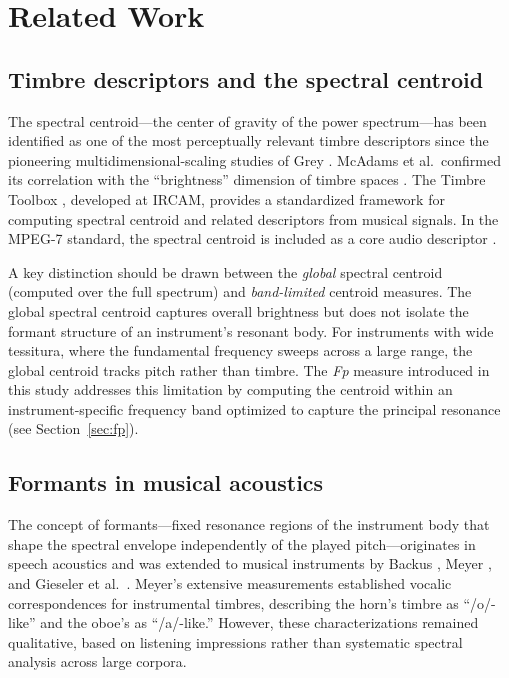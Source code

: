 \documentclass[12pt,a4paper]{article}
\begin{document}
\section{Related Work}

\subsection{Timbre descriptors and the spectral centroid}

The spectral centroid---the center of gravity of the power spectrum---has been
identified as one of the most perceptually relevant timbre descriptors since the
pioneering multidimensional-scaling studies of Grey \citep{Grey1977}. McAdams
et al.\ confirmed its correlation with the ``brightness'' dimension of timbre
spaces \citep{McAdams1995}. The Timbre Toolbox \citep{Peeters2011}, developed
at IRCAM, provides a standardized framework for computing spectral centroid and
related descriptors from musical signals. In the MPEG-7 standard, the spectral
centroid is included as a core audio descriptor \citep{MPEG7}.

A key distinction should be drawn between the \emph{global} spectral centroid
(computed over the full spectrum) and \emph{band-limited} centroid measures. The
global spectral centroid captures overall brightness but does not isolate the
formant structure of an instrument's resonant body. For instruments with wide
tessitura, where the fundamental frequency sweeps across a large range, the
global centroid tracks pitch rather than timbre. The \textit{Fp} measure
introduced in this study addresses this limitation by computing the centroid
within an instrument-specific frequency band optimized to capture the principal
resonance (see Section~\ref{sec:fp}).

\subsection{Formants in musical acoustics}

The concept of formants---fixed resonance regions of the instrument body that
shape the spectral envelope independently of the played pitch---originates in
speech acoustics \citep{Fant1960} and was extended to musical instruments by
Backus \citep{Backus1969}, Meyer \citep{Meyer2009}, and Gieseler et al.\
\citep{Gieseler1985}. Meyer's extensive measurements established vocalic
correspondences for instrumental timbres, describing the horn's timbre as
``/o/-like'' and the oboe's as ``/a/-like.'' However, these characterizations
remained qualitative, based on listening impressions rather than systematic
spectral analysis across large corpora.
\end{document}
